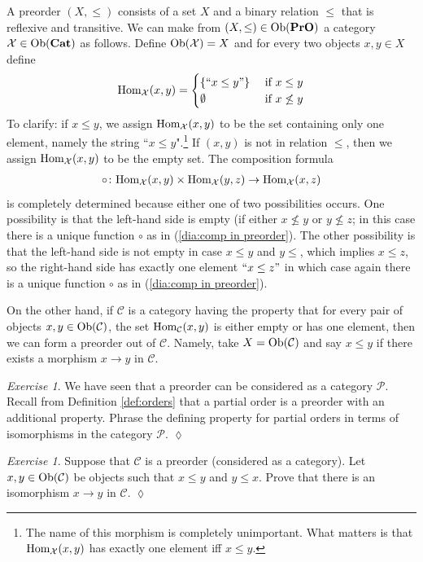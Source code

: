 \documentclass{book}
\def\tn{\textnormal}
\def\mc{\mathcal}
\def\Hom{\tn{Hom}}
\def\Ob{\tn{Ob}}
\def\to{\rightarrow}
\def\taking{\colon}
\def\Cat{{\bf Cat}}
\def\PrO{{\bf PrO}}
\def\mcC{\mc{C}}
\def\mcP{\mc{P}}
\def\mcX{\mc{X}}
\theoremstyle{remark}
\newtheorem{exc}[subsubsection]{Exercise}
\newenvironment{exercise}{\begin{exc}}{\hspace*{\fill}$\lozenge$\end{exc}}
\theoremstyle{definition}
\begin{document}
A preorder $(X,\leq)$ consists of a set $X$ and a binary relation $\leq$ that is reflexive and transitive. We can make from $(X,\leq)\in\Ob(\PrO)$ a category $\mcX\in\Ob(\Cat)$ as follows. Define $\Ob(\mcX)=X$ and for every two objects $x,y\in X$ define 
$$\Hom_\mcX(x,y)=\begin{cases}\{``x\leq y"\}&\tn{ if } x\leq y\\\emptyset&\tn{ if } x\not\leq y\end{cases}$$
To clarify: if $x\leq y$, we assign $\Hom_\mcX(x,y)$ to be the set containing only one element, namely the string ``$x\leq y$".\footnote{The name of this morphism is completely unimportant. What matters is that $\Hom_\mcX(x,y)$ has exactly one element iff $x\leq y$.} If $(x,y)$ is not in relation $\leq$, then we assign $\Hom_\mcX(x,y)$ to be the empty set. The composition formula 
\begin{align}\label{dia:comp in preorder}
\circ\taking\Hom_\mcX(x,y)\times\Hom_\mcX(y,z)\to\Hom_\mcX(x,z)
\end{align}
is completely determined because either one of two possibilities occurs. One possibility is that the left-hand side is empty (if either $x\not\leq y$ or $y\not\leq z$; in this case there is a unique function $\circ$ as in (\ref{dia:comp in preorder}). The other possibility is that the left-hand side is not empty in case $x\leq y$ and $y\leq$, which implies $x\leq z$, so the right-hand side has exactly one element $``x\leq z"$ in which case again there is a unique function $\circ$ as in (\ref{dia:comp in preorder}).

On the other hand, if $\mcC$ is a category having the property that for every pair of objects $x,y\in\Ob(\mcC)$, the set $\Hom_\mcC(x,y)$ is either empty or has one element, then we can form a preorder out of $\mcC$. Namely, take $X=\Ob(\mcC)$ and say $x\leq y$ if there exists a morphism $x\to y$ in $\mcC$. 

\begin{exercise}
We have seen that a preorder can be considered as a category $\mcP$. Recall from Definition \ref{def:orders} that a partial order is a preorder with an additional property. Phrase the defining property for partial orders in terms of isomorphisms in the category $\mcP$.
\end{exercise}

\begin{exercise}
Suppose that $\mcC$ is a preorder (considered as a category). Let $x,y\in\Ob(\mcC)$ be objects such that $x\leq y$ and $y\leq x$. Prove that there is an isomorphism $x\to y$ in $\mcC$.
\end{exercise}
\end{document}
